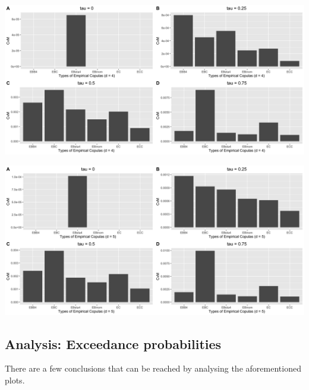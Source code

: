 \documentclass[12pt]{report}
\newcommand{\1}{\mathbf{1}}
\begin{document}
\begin{flushleft}
\begin{center}
\label{G_4d_s_CvM}
\includegraphics[width=17cm]{ExceedanceCvM/G_4d_s_CvM.png}
\end{center}%

\begin{center}
\label{G_5d_s_CvM}
\includegraphics[width=17cm]{ExceedanceCvM/G_5d_s_CvM.png}
\end{center}%

\newpage
\subsection{Analysis: Exceedance probabilities}
\vspace{0.5cm}
There are a few conclusions that can be reached by analysing the aforementioned plots. \\


\end{flushleft}
\end{document}
